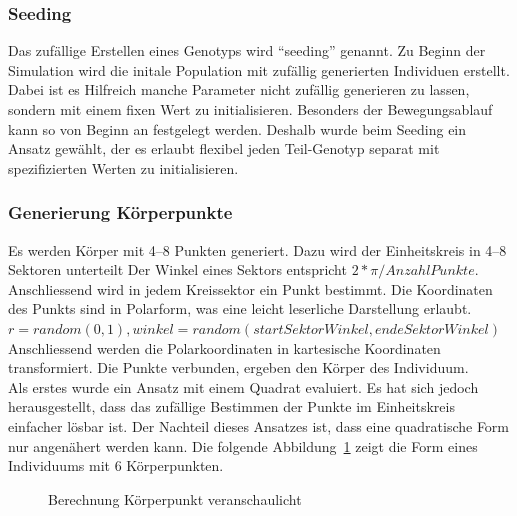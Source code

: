       \subsubsection{Seeding\label{subsub:GenotypeSeeding}}

        Das zufällige Erstellen eines Genotyps wird ``seeding'' genannt.
        Zu Beginn der Simulation wird die initale Population mit zufällig generierten Individuen erstellt.
        Dabei ist es Hilfreich manche Parameter nicht zufällig generieren zu lassen,
        sondern mit einem fixen Wert zu initialisieren.
        Besonders der Bewegungsablauf kann so von Beginn an festgelegt werden.
        Deshalb wurde beim Seeding ein Ansatz gewählt, der es erlaubt flexibel jeden Teil-Genotyp separat mit
        spezifizierten Werten zu initialisieren.

      \subsubsection{Generierung Körperpunkte\label{subsub:GenotypGenerierungKörperpunkte}}

        Es werden Körper mit 4--8 Punkten generiert.
        Dazu wird der Einheitskreis in 4--8 Sektoren unterteilt
        Der Winkel eines Sektors entspricht \( 2 * \pi / Anzahl Punkte\).
        \\
        Anschliessend wird in jedem Kreissektor ein Punkt bestimmt.
        Die Koordinaten des Punkts sind in Polarform, was eine leicht leserliche Darstellung erlaubt.
        \\
        \( r = random (0, 1), winkel = random(startSektorWinkel, endeSektorWinkel) \)
        Anschliessend werden die Polarkoordinaten in kartesische Koordinaten transformiert.
        Die Punkte verbunden, ergeben den Körper des Individuum.
        \\
        Als erstes wurde ein Ansatz mit einem Quadrat evaluiert.
        Es hat sich jedoch herausgestellt,
        dass das zufällige Bestimmen der Punkte im Einheitskreis einfacher lösbar ist.
        Der Nachteil dieses Ansatzes ist, dass eine quadratische Form nur angenähert werden kann.
        Die folgende Abbildung~\ref{fig:kp} zeigt die Form eines Individuums mit 6 Körperpunkten.
        \\
        \begin{figure}[H]
          
          \caption{Berechnung Körperpunkt veranschaulicht\label{fig:kp}}
        \end{figure}

